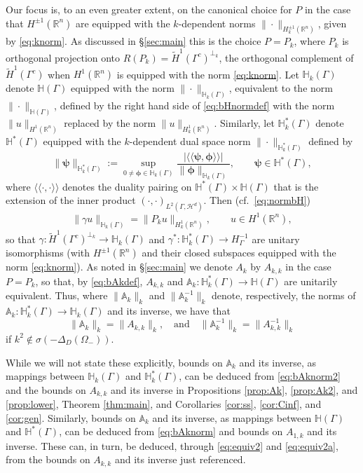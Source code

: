 \documentclass{birkjour}
\theoremstyle{definition}
\theoremstyle{remark}
\numberwithin{equation}{section}
\newcommand{\R}{\mathbb{R}}
\newcommand{\cH}{\mathcal{H}}
\newcommand{\bA}{\mathbb{A}}
\newcommand{\bH}{\mathbb{H}}
\newcommand{\bphi}{\boldsymbol{\phi}}
\newcommand{\bpsi}{\boldsymbol{\psi}}
\begin{document}
Our focus is, to an even greater extent, on the canonical choice for $P$ in the case that $H^{\pm1}(\R^n)$ are equipped with the $k$-dependent norms $\|\cdot\|_{H_k^{\pm 1}(\R^n)}$, given by \eqref{eq:knorm}. As discussed in \S\ref{sec:main} this is the choice $P=P_k$, where $P_k$ is orthogonal projection onto $R(P_k)= \widetilde H^1(\Gamma^c)^{\perp_k}$, the orthogonal complement of $\widetilde H^1(\Gamma^c)$ when $H^1(\R^n)$ is equipped with the norm \eqref{eq:knorm}. Let $\bH_k(\Gamma)$ denote $\bH(\Gamma)$ equipped with the norm $\|\cdot\|_{\bH_k(\Gamma)}$, equivalent to the norm $\|\cdot\|_{\bH(\Gamma)}$, defined by the right hand  side of \eqref{eq:bHnormdef} with the norm $\|u\|_{H^1(\R^n)}$ replaced by the norm $\|u\|_{H^1_k(\R^n)}$. Similarly, let $\bH_k^*(\Gamma)$ denote $\bH^*(\Gamma)$ equipped with the $k$-dependent dual space norm $\|\cdot\|_{\bH_k^*(\Gamma)}$ defined by
$$
\|\bpsi\|_{\bH^*_k(\Gamma)} := \sup_{0\neq \bphi \in \bH_k(\Gamma)}\frac{|\langle\!\langle \bpsi,\bphi\rangle\!\rangle|}{\|\bphi\|_{\bH_k(\Gamma)}}, \qquad \bpsi \in \bH^*(\Gamma),
$$
where $\langle\!\langle \cdot,\cdot \rangle\!\rangle$ denotes the duality pairing on $\bH^*(\Gamma)\times \bH(\Gamma)$ that is the extension of the inner product $(\cdot,\cdot)_{L^2(\Gamma,\cH^d)}$.
Then (cf.~\eqref{eq:normbH})
\begin{equation} \label{eq:normbHk}
\|\gamma u\|_{\bH_k(\Gamma)} = \|P_k u\|_{H_k^1(\R^n)}, \qquad u\in H^1(\R^n),
\end{equation}
so that $\gamma:\widetilde H^1(\Gamma^c)^{\perp_k} \to \bH_k(\Gamma)$ and $\gamma^*:\bH_k^*(\Gamma)\to H^{-1}_\Gamma$ are unitary isomorphisms (with  $H^{\pm 1}(\R^n)$ and their closed subspaces equipped with the norm \eqref{eq:knorm}). As noted in \S\ref{sec:main} we denote $A_k$ by $A_{k,k}$ in the case $P=P_k$, so that, by \eqref{eq:bAkdef},  $A_{k,k}$ and $\bA_k:\bH^*_k(\Gamma)\to \bH(\Gamma)$ are unitarily equivalent. Thus, where $\|\bA_k\|_k$ and $\|\bA_k^{-1}\|_k$ denote, respectively, the norms of $\bA_k:\bH^*_k(\Gamma)\to \bH_k(\Gamma)$ and its inverse, we have that
\begin{equation} \label{eq:bAknorm2}
\|\bA_{k}\|_k = \|A_{k,k}\|_k, \quad \mbox{and} \quad \|\bA_{k}^{-1}\|_k = \|A_{k,k}^{-1}\|_k
\end{equation}
if $k^2\not\in \sigma(-\Delta_D(\Omega_-))$. 

While we will not state these explicitly, bounds on $\bA_k$ and its inverse, as mappings between $\bH_k(\Gamma)$ and $\bH^*_k(\Gamma)$, can be deduced from \eqref{eq:bAknorm2} and the bounds on $A_{k,k}$ and its inverse in Propositions \ref{prop:Ak}, \ref{prop:Ak2}, and \ref{prop:lower}, Theorem \ref{thm:main}, and Corollaries \ref{cor:ss}, \ref{cor:Cinf}, and \ref{cor:gen}. Similarly, bounds on $\bA_k$ and its inverse, as mappings between $\bH(\Gamma)$ and $\bH^*(\Gamma)$, can be deduced from \eqref{eq:bAknorm} and bounds on $A_{1,k}$ and its inverse. These can, in turn, be deduced, through \eqref{eq:equiv2} and \eqref{eq:equiv2a}, from the bounds on $A_{k,k}$ and its inverse just referenced. 
\end{document}
